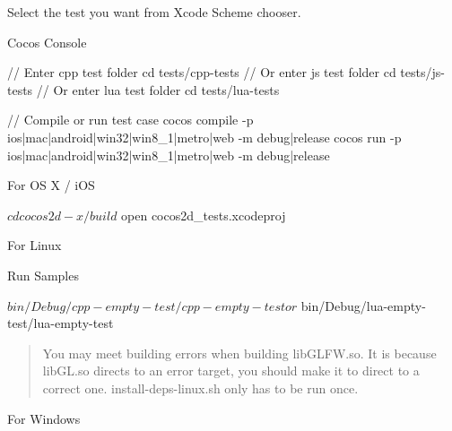 Select the test you want from Xcode Scheme chooser.


\begin{DoxyItemize}
\item Cocos Console
\end{DoxyItemize}


\begin{DoxyCode}
// Enter cpp test folder
cd tests/cpp-tests
// Or enter js test folder
cd tests/js-tests
// Or enter lua test folder
cd tests/lua-tests

// Compile or run test case
cocos compile -p ios|mac|android|win32|win8\_1|metro|web -m debug|release
cocos run -p ios|mac|android|win32|win8\_1|metro|web -m debug|release
\end{DoxyCode}



\begin{DoxyItemize}
\item For OS X / i\+OS
\end{DoxyItemize}


\begin{DoxyCode}
$ cd cocos2d-x/build
$ open cocos2d\_tests.xcodeproj
\end{DoxyCode}



\begin{DoxyItemize}
\item For Linux
\end{DoxyItemize}




Run Samples


\begin{DoxyCode}
$ bin/Debug/cpp-empty-test/cpp-empty-test
or
$ bin/Debug/lua-empty-test/lua-empty-test
\end{DoxyCode}


\begin{quote}
You may meet building errors when building lib\+G\+L\+F\+W.\+so. It is because lib\+G\+L.\+so directs to an error target, you should make it to direct to a correct one. {\ttfamily install-\/deps-\/linux.\+sh} only has to be run once. \end{quote}



\begin{DoxyItemize}
\item For Windows
\end{DoxyItemize}

